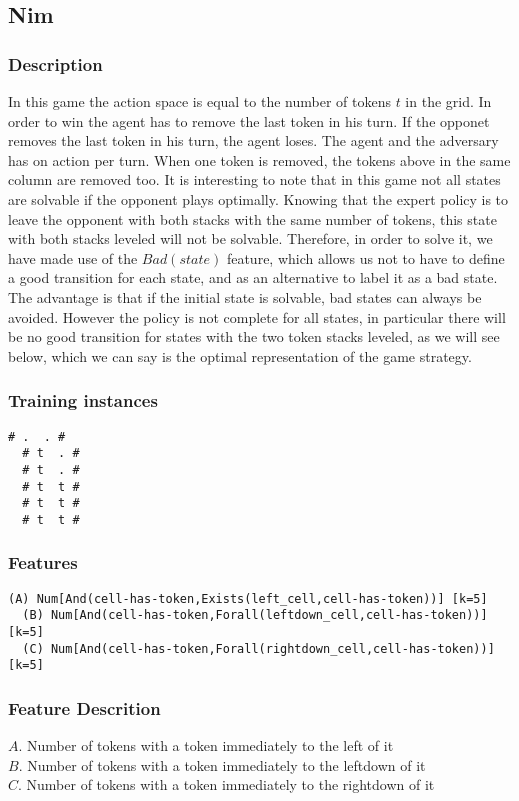 \documentclass[a4paper]{article}
\begin{document}
\subsection{Nim}
\subsubsection{Description}
In this game the action space is equal to the number of tokens $t$ in the grid. In order to win the agent has to remove the last token in his turn. If the opponet removes the last token in his turn, the agent loses. The agent and the adversary has on action per turn. When one token is removed, the tokens above in the same column are removed too.
It is interesting to note that in this game not all states are solvable if the opponent plays optimally. Knowing that the expert policy is to leave the opponent with both stacks with the same number of tokens, this state with both stacks leveled will not be solvable. Therefore, in order to solve it, we have made use of the $Bad(state)$ feature, which allows us not to have to define a good transition for each state, and as an alternative to label it as a bad state. The advantage is that if the initial state is solvable, bad states can always be avoided. However the policy is not complete for all states, in particular there will be no good transition for states with the two token stacks leveled, as we will see below, which we can say is the optimal representation of the game strategy.


\subsubsection{Training instances}
\begin{Verbatim}[fontsize=\footnotesize]
  # .  . #
  # t  . #
  # t  . #
  # t  t #
  # t  t #
  # t  t #
\end{Verbatim}

\subsubsection{Features}
\begin{Verbatim}[fontsize=\footnotesize]
  (A) Num[And(cell-has-token,Exists(left_cell,cell-has-token))] [k=5]
  (B) Num[And(cell-has-token,Forall(leftdown_cell,cell-has-token))] [k=5]
  (C) Num[And(cell-has-token,Forall(rightdown_cell,cell-has-token))] [k=5]
\end{Verbatim}

\subsubsection{Feature Descrition}
$A$. Number of tokens with a token immediately to the left of it\\
$B$. Number of tokens with a token immediately to the leftdown of it\\
$C$. Number of tokens with a token immediately to the rightdown of it
\end{document}
